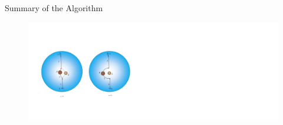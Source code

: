 \documentclass{beamer}
\begin{document}
\begin{frame}
\begin{block}{Summary of the Algorithm}
\begin{figure}
\includegraphics[width=4.85in]{./Figures/SASSchematic3}
\end{figure}
\end{block}
\end{frame}
\end{document}
